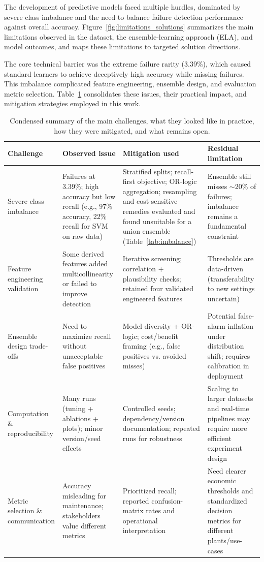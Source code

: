 \documentclass[final,5p, twocolumn]{elsarticle}
\begin{document}
The development of predictive models faced multiple hurdles, dominated by severe class imbalance and the need to balance failure detection performance against overall accuracy. Figure~\ref{fig:limitations_solutions} summarizes the main limitations observed in the dataset, the ensemble-learning approach (ELA), and model outcomes, and maps these limitations to targeted solution directions.


The core technical barrier was the extreme failure rarity (3.39\%), which caused standard learners to achieve deceptively high accuracy while missing failures. This imbalance complicated feature engineering, ensemble design, and evaluation metric selection. Table~\ref{tab:challenges_summary} consolidates these issues, their practical impact, and mitigation strategies employed in this work.

\begin{table}[!htb]
\centering
\small
\renewcommand{\arraystretch}{1.15}
\begin{tabular}{p{3.2cm} p{4.2cm} p{4.2cm} p{3.2cm}}
\hline
\textbf{Challenge} & \textbf{Observed issue} & \textbf{Mitigation used} & \textbf{Residual limitation} \\
\hline
Severe class imbalance & Failures at 3.39\%; high accuracy but low recall (e.g., 97\% accuracy, 22\% recall for SVM on raw data) & Stratified splits; recall-first objective; OR-logic aggregation; resampling and cost-sensitive remedies evaluated and found unsuitable for a union ensemble (Table~\ref{tab:imbalance}) & Ensemble still misses $\sim$20\% of failures; imbalance remains a fundamental constraint \\
\hline
Feature engineering validation & Some derived features added multicollinearity or failed to improve detection & Iterative screening; correlation + plausibility checks; retained four validated engineered features & Thresholds are data-driven (transferability to new settings uncertain) \\
\hline
Ensemble design trade-offs & Need to maximize recall without unacceptable false positives & Model diversity + OR-logic; cost/benefit framing (e.g., false positives vs. avoided misses) & Potential false-alarm inflation under distribution shift; requires calibration in deployment \\
\hline
Computation \& reproducibility & Many runs (tuning + ablations + plots); minor version/seed effects & Controlled seeds; dependency/version documentation; repeated runs for robustness & Scaling to larger datasets and real-time pipelines may require more efficient experiment design \\
\hline
Metric selection \& communication & Accuracy misleading for maintenance; stakeholders value different metrics & Prioritized recall; reported confusion-matrix rates and operational interpretation & Need clearer economic thresholds and standardized decision metrics for different plants/use-cases \\
\hline
\end{tabular}
\caption{Condensed summary of the main challenges, what they looked like in practice, how they were mitigated, and what remains open.}
\label{tab:challenges_summary}
\end{table}
\end{document}
